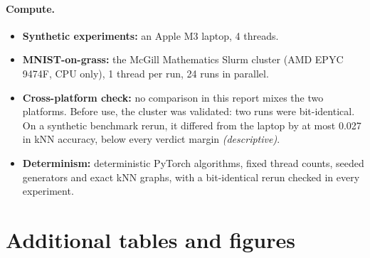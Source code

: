 \documentclass[10pt]{article}
\newcommand{\cdesc}{\textit{\small (descriptive)}}
\begin{document}
\paragraph{Compute.}
\begin{itemize}
  \item \textbf{Synthetic experiments:} an Apple M3 laptop, 4 threads.
  \item \textbf{MNIST-on-grass:} the McGill Mathematics Slurm cluster (AMD EPYC 9474F, CPU only), 1 thread per run, 24 runs in parallel.
  \item \textbf{Cross-platform check:} no comparison in this report mixes the two platforms. Before use, the cluster was validated: two runs were bit-identical. On a synthetic benchmark rerun, it differed from the laptop by at most 0.027 in kNN accuracy, below every verdict margin \cdesc.
  \item \textbf{Determinism:} deterministic PyTorch algorithms, fixed thread counts, seeded generators and exact kNN graphs, with a bit-identical rerun checked in every experiment.
\end{itemize}

\section{Additional tables and figures}
\label{app:tables}
\end{document}
